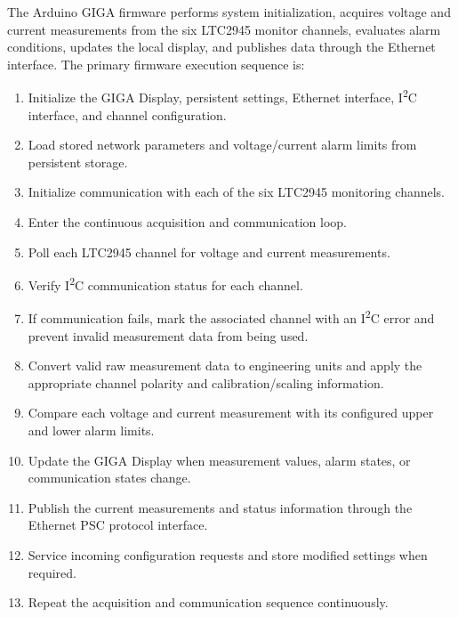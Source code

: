 The Arduino GIGA firmware performs system initialization, acquires voltage and
current measurements from the six LTC2945 monitor channels, evaluates alarm
conditions, updates the local display, and publishes data through the Ethernet interface. The primary firmware execution
sequence is:

\begin{enumerate}
    \item Initialize the GIGA Display, persistent settings, Ethernet interface,
    I\textsuperscript{2}C interface, and channel configuration.

    \item Load stored network parameters and voltage/current alarm limits from
    persistent storage.

    \item Initialize communication with each of the six LTC2945 monitoring
    channels.

    \item Enter the continuous acquisition and communication loop.

    \item Poll each LTC2945 channel for voltage and current measurements.

    \item Verify I\textsuperscript{2}C communication status for each channel.

    \item If communication fails, mark the associated channel with an
    I\textsuperscript{2}C error and prevent invalid measurement data from being
    used.

    \item Convert valid raw measurement data to engineering units and apply the
    appropriate channel polarity and calibration/scaling information.

    \item Compare each voltage and current measurement with its configured
    upper and lower alarm limits.

    \item Update the GIGA Display when measurement values, alarm states, or
    communication states change.

    \item Publish the current measurements and status information through the
    Ethernet PSC protocol interface.

    \item Service incoming configuration requests and store modified settings
    when required.

    \item Repeat the acquisition and communication sequence continuously.
\end{enumerate}


